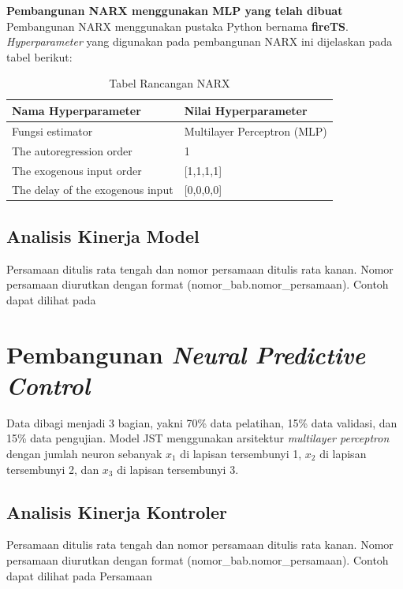 

\noindent \textbf{{Pembangunan NARX menggunakan MLP yang telah dibuat}} \\

Pembangunan NARX menggunakan pustaka Python bernama \textbf{fireTS}. \textit{Hyperparameter} yang digunakan pada pembangunan NARX ini dijelaskan pada tabel berikut:
\begin{table}[!h]
	\caption{Tabel Rancangan NARX}
	\label{tbl:5:NARXDesign}
	\centering
	\begin{tabular}{|p{5.7cm}|p{5cm}|}
		\hline
		\textbf{Nama Hyperparameter} & \textbf{Nilai Hyperparameter} \\
		\hline
		Fungsi estimator & Multilayer Perceptron (MLP) \\
		\hline
		The autoregression order & 1 \\
		\hline
		The exogenous input order & [1,1,1,1] \\
		\hline
		The delay of the exogenous input& [0,0,0,0] \\
		\hline
	\end{tabular}
\end{table}

\subsection{Analisis Kinerja Model}
Persamaan ditulis rata tengah dan nomor persamaan ditulis rata kanan. Nomor persamaan
diurutkan dengan format (nomor\_bab.nomor\_persamaan). Contoh dapat dilihat pada

\section{Pembangunan \textit{Neural Predictive Control}}
Data dibagi menjadi 3 bagian, yakni 70\% data pelatihan, 15\% data validasi, dan 15\% data pengujian. Model JST menggunakan arsitektur \textit{multilayer perceptron} dengan jumlah neuron sebanyak $x_1$ di lapisan tersembunyi 1, $x_2$ di lapisan tersembunyi 2, dan $x_3$ di lapisan tersembunyi 3.

\subsection{Analisis Kinerja Kontroler}
Persamaan ditulis rata tengah dan nomor persamaan ditulis rata kanan. Nomor persamaan
diurutkan dengan format (nomor\_bab.nomor\_persamaan). Contoh dapat dilihat pada Persamaan